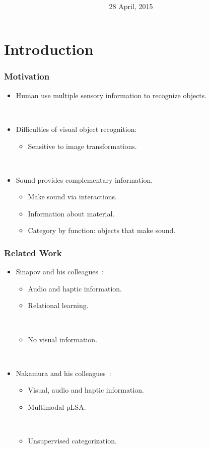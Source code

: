 \documentclass{beamer}
\title{\trtitle \\ \vspace{5pt} \footnotesize \trtype}
\author{\trauthor \\ \vspace{5pt} \footnotesize \trfach}
\date{28 April, 2015}
\begin{document}
\frame{\titlepage}


\section{Introduction}
\begin{frame}
  \frametitle{Motivation}

  \begin{itemize}
    \item Human use multiple sensory information to recognize objects.

      ~
    \item Difficulties of visual object recognition:
      \begin{itemize}
        \item Sensitive to image transformations. 
      \end{itemize}

      ~
    \item Sound provides complementary information.
      \begin{itemize}
        \item Make sound via interactions.
        \item Information about material. 
        \item Category by function: objects that make sound.
      \end{itemize}
  \end{itemize}
\end{frame}

\begin{frame}
  \frametitle{Related Work}

  \begin{itemize}
    \item Sinapov and his colleagues~\cite{sinapov_interactive_2009,sinapov_object_2011}: 
      \begin{itemize}
        \item Audio and haptic information.
        \item Relational learning.

          ~
        \item No visual information.
      \end{itemize}

      ~
    \item Nakamura and his colleagues~\cite{nakamura_multimodal_2007,nakamura_bag_2012}:
      \begin{itemize}
        \item Visual, audio and haptic information.
        \item Multimodal pLSA.

          ~
        \item Unsupervised categorization.
      \end{itemize}
  \end{itemize}
\end{frame}
\end{document}
